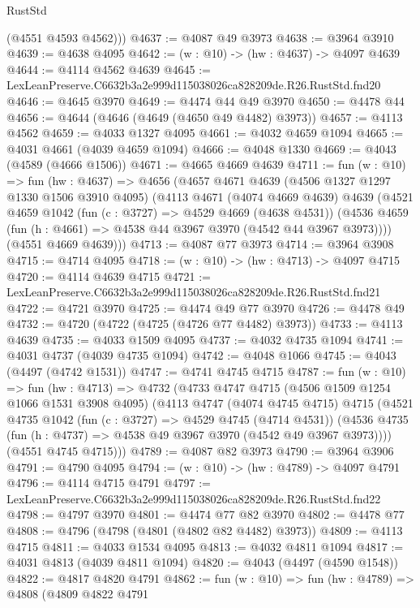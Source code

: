 \begin{lexlean}{RustStd}
\begin{coremodule}
        (@4551 @4593 @4562)))
@4637 := @4087 @49 @3973
@4638 := @3964 @3910
@4639 := @4638 @4095
@4642 := (w : @10) -> (hw : @4637) -> @4097 @4639
@4644 := @4114 @4562 @4639
@4645 := LexLeanPreserve.C6632b3a2e999d115038026ca828209de.R26.RustStd.fnd20
@4646 := @4645 @3970
@4649 := @4474 @44 @49 @3970
@4650 := @4478 @44
@4656 := @4644 (@4646 (@4649 (@4650 @49 @4482) @3973))
@4657 := @4113 @4562
@4659 := @4033 @1327 @4095
@4661 := @4032 @4659 @1094
@4665 := @4031 @4661 (@4039 @4659 @1094)
@4666 := @4048 @1330
@4669 := @4043 (@4589 (@4666 @1506))
@4671 := @4665 @4669 @4639
@4711 := fun (w : @10) =>
  fun (hw : @4637) =>
  @4656
    (@4657
      @4671
      @4639
      (@4506 @1327 @1297 @1330 @1506 @3910 @4095)
      (@4113
        @4671
        (@4074 @4669 @4639)
        @4639
        (@4521
          @4659
          @1042
          (fun (c : @3727) => @4529 @4669 (@4638 @4531))
          (@4536 @4659 (fun (h : @4661) => @4538 @44 @3967 @3970 (@4542 @44 @3967 @3973))))
        (@4551 @4669 @4639)))
@4713 := @4087 @77 @3973
@4714 := @3964 @3908
@4715 := @4714 @4095
@4718 := (w : @10) -> (hw : @4713) -> @4097 @4715
@4720 := @4114 @4639 @4715
@4721 := LexLeanPreserve.C6632b3a2e999d115038026ca828209de.R26.RustStd.fnd21
@4722 := @4721 @3970
@4725 := @4474 @49 @77 @3970
@4726 := @4478 @49
@4732 := @4720 (@4722 (@4725 (@4726 @77 @4482) @3973))
@4733 := @4113 @4639
@4735 := @4033 @1509 @4095
@4737 := @4032 @4735 @1094
@4741 := @4031 @4737 (@4039 @4735 @1094)
@4742 := @4048 @1066
@4745 := @4043 (@4497 (@4742 @1531))
@4747 := @4741 @4745 @4715
@4787 := fun (w : @10) =>
  fun (hw : @4713) =>
  @4732
    (@4733
      @4747
      @4715
      (@4506 @1509 @1254 @1066 @1531 @3908 @4095)
      (@4113
        @4747
        (@4074 @4745 @4715)
        @4715
        (@4521
          @4735
          @1042
          (fun (c : @3727) => @4529 @4745 (@4714 @4531))
          (@4536 @4735 (fun (h : @4737) => @4538 @49 @3967 @3970 (@4542 @49 @3967 @3973))))
        (@4551 @4745 @4715)))
@4789 := @4087 @82 @3973
@4790 := @3964 @3906
@4791 := @4790 @4095
@4794 := (w : @10) -> (hw : @4789) -> @4097 @4791
@4796 := @4114 @4715 @4791
@4797 := LexLeanPreserve.C6632b3a2e999d115038026ca828209de.R26.RustStd.fnd22
@4798 := @4797 @3970
@4801 := @4474 @77 @82 @3970
@4802 := @4478 @77
@4808 := @4796 (@4798 (@4801 (@4802 @82 @4482) @3973))
@4809 := @4113 @4715
@4811 := @4033 @1534 @4095
@4813 := @4032 @4811 @1094
@4817 := @4031 @4813 (@4039 @4811 @1094)
@4820 := @4043 (@4497 (@4590 @1548))
@4822 := @4817 @4820 @4791
@4862 := fun (w : @10) =>
  fun (hw : @4789) =>
  @4808
    (@4809
      @4822
      @4791

\end{coremodule}
\end{lexlean}
